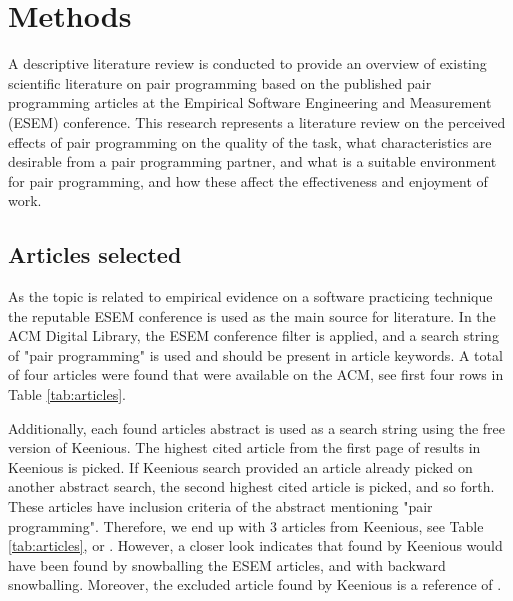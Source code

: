 \documentclass[conference]{IEEEtran}
\begin{document}
\section{Methods}

A descriptive literature review is conducted to provide an overview of existing scientific literature on pair programming based on the published pair programming articles at the Empirical Software Engineering and Measurement (ESEM) conference. This research represents a literature review on the perceived effects of pair programming on the quality of the task, what characteristics are desirable from a pair programming partner, and what is a suitable environment for pair programming, and how these affect the effectiveness and enjoyment of work. 

\subsection{Articles selected}

As the topic is related to empirical evidence on a software practicing technique the reputable ESEM conference is used as the main source for literature. In the ACM Digital Library, the ESEM conference filter is applied, and a search string of "pair programming" is used and should be present in article keywords. A total of four articles were found that were available on the ACM, see first four rows in Table \ref{tab:articles}.

Additionally, each found articles abstract is used as a search string using the free version of Keenious. The highest cited article from the first page of results in Keenious is picked. If Keenious search provided an article already picked on another abstract search, the second highest cited article is picked, and so forth. These articles have inclusion criteria of the abstract mentioning "pair programming". Therefore, we end up with 3 articles from Keenious, see Table \ref{tab:articles}, or \cite{Williams2000Strengthening, Arisholm2007Evaluating, Hannay2009effectiveness}. However, a closer look indicates that \cite{Williams2000Strengthening, Arisholm2007Evaluating} found by Keenious would have been found by snowballing the ESEM articles, and \cite{Hannay2009effectiveness} with backward snowballing. Moreover, the excluded article \cite{ChamorroPremuzic2003Personality} found by Keenious is a reference of \cite{10.1145/1852786.1852816}.
\end{document}
